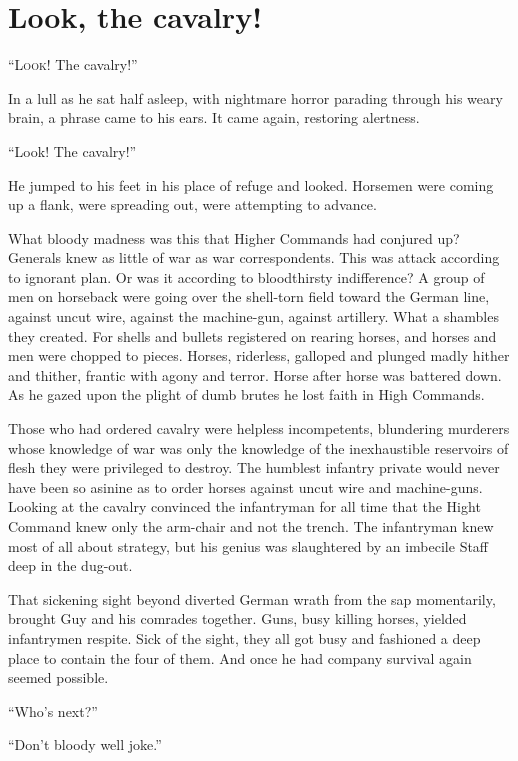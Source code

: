 \chapter*{\textsf{Look, the cavalry!}}

``L\textsc{ook!} The cavalry!''

In a lull as he sat half asleep, with nightmare horror parading through his weary brain, a phrase came to his ears. It came again, restoring alertness.

``Look! The cavalry!''

He jumped to his feet in his place of refuge and looked. Horsemen were coming up a flank, were spreading out, were attempting to advance.

What bloody madness was this that Higher Commands had conjured up? Generals knew as little of war as war correspondents. This was attack according to ignorant plan. Or was it according to bloodthirsty indifference? A group of men on horseback were going over the shell-torn field toward the German line, against uncut wire, against the machine-gun, against artillery. What a shambles they created. For shells and bullets registered on rearing horses, and horses and men were chopped to pieces. Horses, riderless, galloped and plunged madly hither and thither, frantic with agony and terror. Horse after horse was battered down. As he gazed upon the plight of dumb brutes he lost faith in High Commands.

Those who had ordered cavalry were helpless incompetents, blundering murderers whose knowledge of war was only the knowledge of the inexhaustible reservoirs of flesh they were privileged to destroy. The humblest infantry private would never have been so asinine as to order horses against uncut wire and machine-guns. Looking at the cavalry convinced the infantryman for all time that the Hight Command knew only the arm-chair and not the trench. The infantryman knew most of all about strategy, but his genius was slaughtered by an imbecile Staff deep in the dug-out.

That sickening sight beyond diverted German wrath from the sap momentarily, brought Guy and his comrades together. Guns, busy killing horses, yielded infantrymen respite. Sick of the sight, they all got busy and fashioned a deep place to contain the four of them. And once he had company survival again seemed possible.

``Who's next?''

``Don't bloody well joke.''

